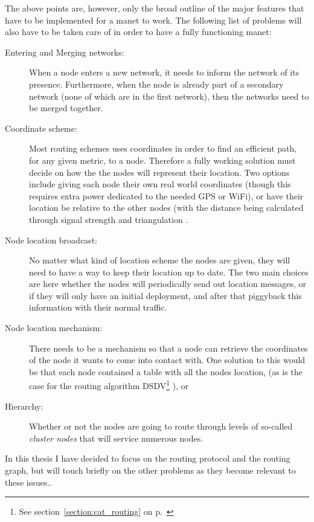 The above points are, however, only the broad outline of the major features that have to be implemented for a \ac{manet} to work. The following list of problems will also have to be taken care of in order to have a fully functioning \ac{manet}:

\begin{description}
\item[Entering and Merging networks:] When a node enters a new network, it needs to inform the network of its presence. Furthermore, when the node is already part of a secondary network (none of which are in the first network), then the networks need to be merged together.  
\item[Coordinate scheme:] Most routing schemes uses coordinates in order to find an efficient path, for any given metric, to a node. Therefore a fully working solution must decide on how the the nodes will represent their location. Two options include giving each node their own real world coordinates (though this requires extra power dedicated to the needed GPS or WiFi), or have their location be relative to the other nodes (with the distance being calculated through signal strength and triangulation \cite{geoNoInfo}.
\item[Node location broadcast:] No matter what kind of location scheme the nodes are given, they will need to have a way to keep their location up to date. The two main choices are here whether the nodes will periodically send out location messages, or if they will only have an initial deployment, and after that piggyback this information with their normal traffic.
\item[Node location mechanism:] There needs to be a mechanism so that a node can retrieve the coordinates of the node it wants to come into contact with. One solution to this would be that each node contained a table with all the nodes location, (as is the case for the routing algorithm DSDV\footnote{See section~\ref{section:cat_routing} on p.~\pageref{section:cat_routing}} \cite{DSDV}), or 
\item[Hierarchy:] Whether or not the nodes are going to route through levels of so-called \emph{cluster nodes} that will service numerous nodes.
\end{description} 

In this thesis I have decided to focus on the routing protocol and the routing graph, but will touch briefly on the other problems as they become relevant to these issues..


